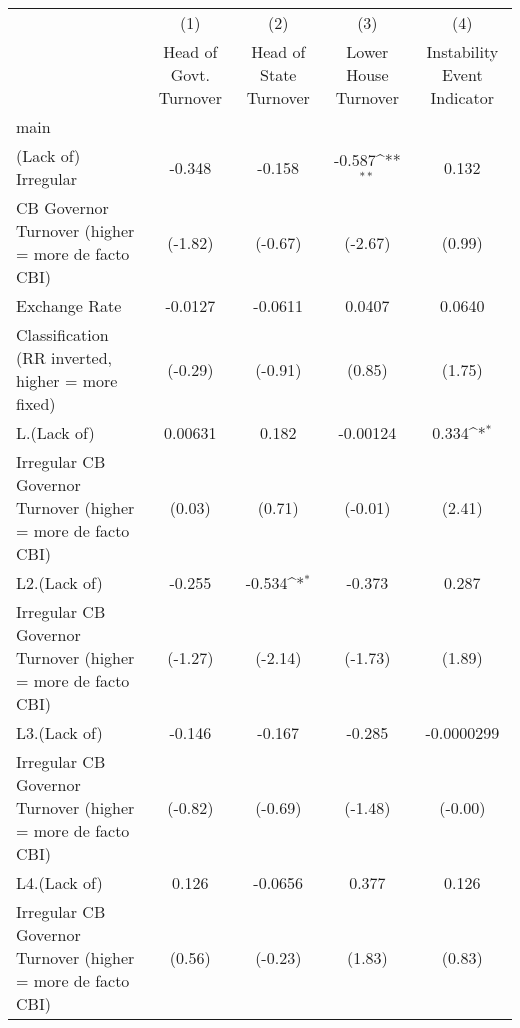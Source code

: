 {
\def\sym#1{\ifmmode^{#1}\else\(^{#1}\)\fi}
\begin{tabular}{l*{4}{c}}
\hline\hline
                    &\multicolumn{1}{c}{(1)}&\multicolumn{1}{c}{(2)}&\multicolumn{1}{c}{(3)}&\multicolumn{1}{c}{(4)}\\
                    &\multicolumn{1}{c}{Head of Govt. Turnover}&\multicolumn{1}{c}{Head of State Turnover}&\multicolumn{1}{c}{Lower House Turnover}&\multicolumn{1}{c}{Instability Event Indicator}\\
\hline
main                &                     &                     &                     &                     \\
(Lack of) Irregular &      -0.348         &      -0.158         &      -0.587\sym{**} &       0.132         \\
CB Governor Turnover (higher = more de facto CBI)&     (-1.82)         &     (-0.67)         &     (-2.67)         &      (0.99)         \\
[1em]
Exchange Rate       &     -0.0127         &     -0.0611         &      0.0407         &      0.0640         \\
Classification (RR inverted, higher = more fixed)&     (-0.29)         &     (-0.91)         &      (0.85)         &      (1.75)         \\
[1em]
L.(Lack of)         &     0.00631         &       0.182         &    -0.00124         &       0.334\sym{*}  \\
Irregular CB Governor Turnover (higher = more de facto CBI)&      (0.03)         &      (0.71)         &     (-0.01)         &      (2.41)         \\
[1em]
L2.(Lack of)        &      -0.255         &      -0.534\sym{*}  &      -0.373         &       0.287         \\
Irregular CB Governor Turnover (higher = more de facto CBI)&     (-1.27)         &     (-2.14)         &     (-1.73)         &      (1.89)         \\
[1em]
L3.(Lack of)        &      -0.146         &      -0.167         &      -0.285         &  -0.0000299         \\
Irregular CB Governor Turnover (higher = more de facto CBI)&     (-0.82)         &     (-0.69)         &     (-1.48)         &     (-0.00)         \\
[1em]
L4.(Lack of)        &       0.126         &     -0.0656         &       0.377         &       0.126         \\
Irregular CB Governor Turnover (higher = more de facto CBI)&      (0.56)         &     (-0.23)         &      (1.83)         &      (0.83)         \\

\end{tabular}}
